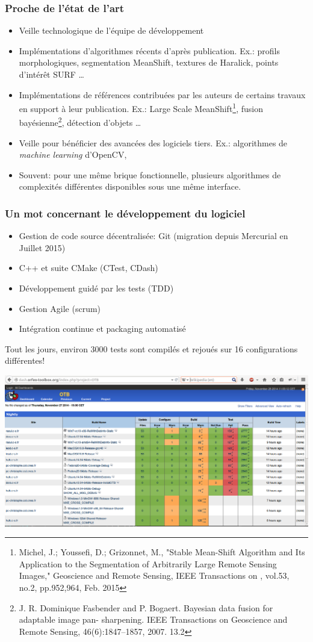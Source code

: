 \documentclass[8pt]{beamer}
\begin{document}
\begin{frame}
\frametitle{Proche de l'état de l'art}
\begin{itemize}
\item Veille technologique de l'équipe de développement
\item Implémentations d'algorithmes récents d'après publication. Ex.: profils morphologiques, segmentation MeanShift, textures de Haralick, points d'intérêt SURF \ldots
\item Implémentations de références contribuées par les auteurs de certains travaux en support à leur publication. Ex.: Large Scale MeanShift\footnote{Michel, J.; Youssefi, D.; Grizonnet, M., "Stable Mean-Shift Algorithm and Its Application to the Segmentation of Arbitrarily Large Remote Sensing Images," Geoscience and Remote Sensing, IEEE Transactions on , vol.53, no.2, pp.952,964, Feb. 2015}, fusion bayésienne\footnote{J. R. Dominique Fasbender and P. Bogaert. Bayesian data fusion for adaptable image pan-
sharpening. IEEE Transactions on Geoscience and Remote Sensing, 46(6):1847–1857, 2007.
13.2}, détection d'objets \ldots
\item Veille pour bénéficier des avancées des logiciels tiers. Ex.: algorithmes de \textit{machine learning} d'OpenCV,
\item Souvent: pour une même brique fonctionnelle, plusieurs algorithmes de complexités différentes disponibles sous une même interface.
\end{itemize}
\end{frame}

\begin{frame}
\frametitle{Un mot concernant le développement du logiciel}
\vspace{-0.5cm}
\begin{itemize}
\item Gestion de code source décentralisée: Git (migration depuis Mercurial en
  Juillet 2015)
\item C++ et suite CMake (CTest, CDash)
\item Développement guidé par les tests (TDD)
\item Gestion Agile (scrum)
\item Intégration continue et packaging automatisé
\end{itemize}
Tout les jours, environ 3000 tests sont compilés et rejoués sur 16 configurations différentes!
\begin{center}
\includegraphics[width=\textwidth,trim=0 250 0 0,clip=true]{images/dashboard.png}
\end{center}
\end{frame}
\end{document}
